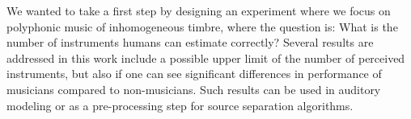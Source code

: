 
We wanted to take a first step by designing an experiment where we focus on polyphonic music of inhomogeneous timbre, where the question is: What is the number of instruments humans can estimate correctly?
Several results are addressed in this work include a possible upper limit of the number of perceived instruments, but also if one can see significant differences in performance of musicians compared to non-musicians.
Such results can be used in auditory modeling or as a pre-processing step for source separation algorithms.

